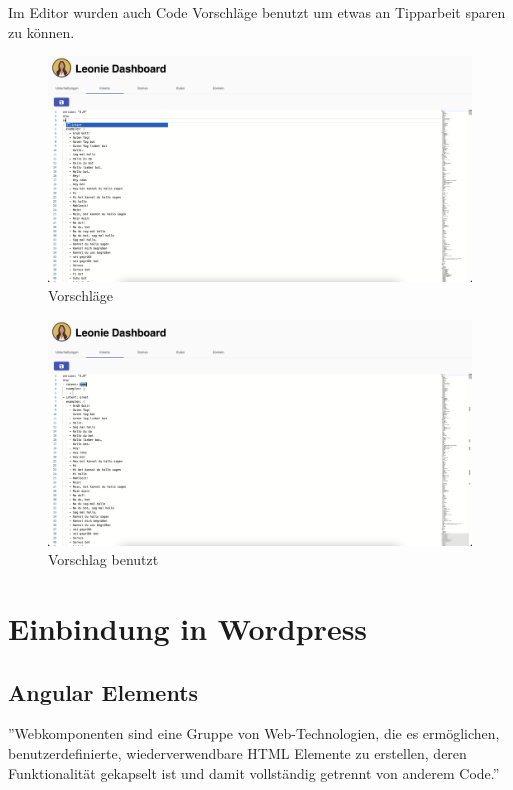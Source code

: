 Im Editor wurden auch Code Vorschläge benutzt um etwas an Tipparbeit sparen zu können.

\begin{figure}[hbt!]
    \centering
    \includegraphics[scale=0.2]{pics/dashboardCodeSuggestion}
    \caption{Vorschläge}
    \label{fig:impl:dashboardCodeSuggestion}
\end{figure}
\begin{figure}[hbt!]
    \centering
    \includegraphics[scale=0.2]{pics/dashboardSuggestionMade}
    \caption{Vorschlag benutzt}
    \label{fig:impl:dashboardCodeSuggestionMade}
\end{figure}



\section{Einbindung in Wordpress}
\subsection{Angular Elements}
''Webkomponenten sind eine Gruppe von Web-Technologien, die es ermöglichen, benutzerdefinierte, wiederverwendbare HTML Elemente zu erstellen, deren Funktionalität gekapselt ist und damit vollständig getrennt von anderem Code.''\cite{webcomponents}

